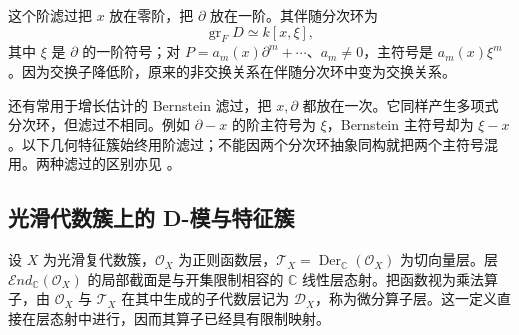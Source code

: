 \ProseParagraphBreak
这个阶滤过把 \(x\) 放在零阶，把 \(\partial\) 放在一阶。其伴随分次环为
\[
	\operatorname{gr}_F D\simeq k[x,\xi],
\]
其中 \(\xi\) 是 \(\partial\) 的一阶符号；对 \(P=a_m(x)\partial^m+\cdots\)、\(a_m\ne0\)，主符号是 \(a_m(x)\xi^m\)。因为交换子降低阶，原来的非交换关系在伴随分次环中变为交换关系。

\ProseParagraphBreak
还有常用于增长估计的 Bernstein 滤过，把 \(x,\partial\) 都放在一次。它同样产生多项式分次环，但滤过不相同。例如 \(\partial-x\) 的阶主符号为 \(\xi\)，Bernstein 主符号却为 \(\xi-x\)。以下几何特征簇始终用阶滤过；不能因两个分次环抽象同构就把两个主符号混用。两种滤过的区别亦见 \cite[Section 3.2, pp. 88--90]{HottaTakeuchiTanisaki2008DModules}。

\subsection{光滑代数簇上的 D-模与特征簇}
\label{b5:subsec:D01:03}

设 \(X\) 为光滑复代数簇，\(\mathcal O_X\) 为正则函数层，\(\mathcal T_X=\operatorname{Der}_{\mathbb C}(\mathcal O_X)\) 为切向量层。层 \(\mathcal End_{\mathbb C}(\mathcal O_X)\) 的局部截面是与开集限制相容的 \(\mathbb C\) 线性层态射。把函数视为乘法算子，由 \(\mathcal O_X\) 与 \(\mathcal T_X\) 在其中生成的子代数层记为 \(\mathcal D_X\)，称为微分算子层。这一定义直接在层态射中进行，因而其算子已经具有限制映射。

